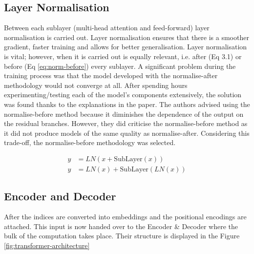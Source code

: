 \documentclass[12pt,a4paper,twoside,openright]{report}
\begin{document}
\subsection{Layer Normalisation}
\label{layer-norm}
Between each sublayer (multi-head attention and feed-forward) layer normalisation is carried out. Layer normalisation ensures that there is a smoother gradient, faster training and allows for better generalisation.
Layer normalisation is vital; however, when it is carried out is equally relevant, i.e. after (Eq 3.1) or  before (Eq \ref{eq:norm-before}) every sublayer. A significant problem during the training process was that the model developed with the normalise-after methodology would not converge at all. After spending hours experimenting/testing each of the model's components extensively, the solution was found thanks to the explanations in the paper\cite{layernorm}. The authors advised using the normalise-before method because it diminishes the dependence of the output on the residual branches. However, they did criticise the normalise-before method as it did not produce models of the same quality as normalise-after. Considering this trade-off, the normalise-before methodology was selected.

\begin{align}
    y &= LN(x + \text{SubLayer}(x)) \\
    \label{eq:norm-after}
    y &= LN(x) + \text{SubLayer}(LN(x))
    \label{eq:norm-before}
\end{align}



\subsection{Encoder and Decoder}
\label{enc-dec}
After the indices are converted into embeddings and the positional encodings are attached. This input is now handed over to the Encoder \& Decoder where the bulk of the computation takes place. Their structure is displayed in the Figure \ref{fig:transformer-architecture}

\end{document}
